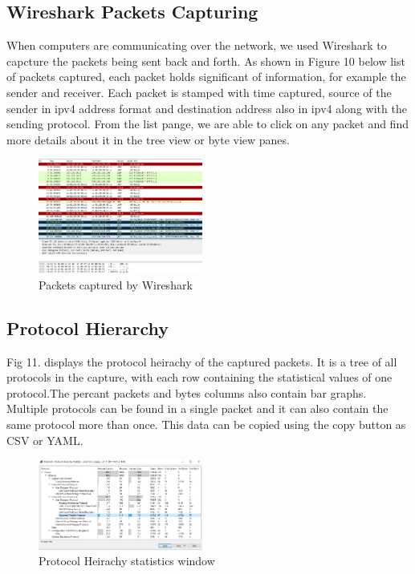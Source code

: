 \documentclass{article}
\begin{document}
\subsection{Wireshark Packets Capturing}
When computers are communicating over the network, we used Wireshark to capcture the packets being sent back and forth. As shown in Figure 10 below list of packets captured, each packet holds significant of information, for example the sender and receiver. Each packet is stamped with time captured, source of the sender in ipv4 address format and destination address also in ipv4 along with the sending protocol. From the list pange, we are able to click on any packet and find more details about it in the tree view or byte view panes. 

\begin{figure}[H]
	\begin{center}
		\includegraphics[width=0.48\textwidth]{wireshark.jpg}
	\end{center}
	\caption{Packets captured by Wireshark}
	\label{fig:Prd}
\end{figure}

\subsection{Protocol Hierarchy}
Fig 11. displays the protocol heirachy of the captured packets. It is a tree of all protocols in the capture, with each row containing the statistical values of one protocol.The percant packets and bytes columns also contain bar graphs. Multiple protocols can be found in a single packet and it can also contain the same protocol more than once. This data can be copied using the copy button as CSV or YAML.
\begin{figure}[H]
	\begin{center}
		\includegraphics[width=0.48\textwidth]{Hierarchyst.jpg}
	\end{center}
	\caption{\small  Protocol Heirachy statistics window\newline}
	\label{fig:Prd}
\end{figure}
\end{document}
